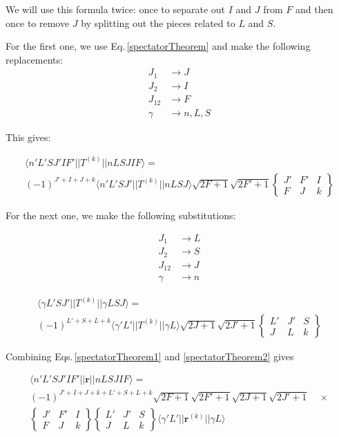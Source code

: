 We will use this formula twice: once to separate out $I$ and $J$ from $F$ and then once to remove $J$ by splitting out the pieces related to $L$ and $S$.

For the first one, we use Eq.\,\ref{spectatorTheorem} and make the following replacements:
\begin{align}
J_1&\rightarrow J\\
J_2&\rightarrow I\\
J_{12}&\rightarrow F\\
\gamma &\rightarrow  n,L,S
\end{align}

This gives: 

\begin{multline}\label{spectatorTheorem1}
\langle n' L' S J' I F'||T^{(k)}||n L S J I F\rangle=
\\(-1)^{J'+I+J+k}\langle n'L' S J'||T^{(k)}|| n L S J\rangle
\sqrt{2F+1}\sqrt{2F'+1}
\begin{Bmatrix}
J' & F' & I \\
F & J & k
\end{Bmatrix}
\end{multline}

For the next one, we make the following substitutions: 

\begin{align}
J_1&\rightarrow L\\
J_2&\rightarrow S\\
J_{12}&\rightarrow J\\
\gamma & \rightarrow n
\end{align}

\begin{multline}\label{spectatorTheorem2}
\langle\gamma L'SJ'||T^{(k)}||\gamma L S J\rangle=
\\(-1)^{L'+S+L+k}\langle\gamma'L'||T^{(k)}||\gamma L\rangle
\sqrt{2J+1}\sqrt{2J'+1}
\begin{Bmatrix}
L' & J' & S \\
J & L & k
\end{Bmatrix}
\end{multline}

Combining Eqs.\,\ref{spectatorTheorem1} and \ref{spectatorTheorem2} gives 

\begin{multline}
\langle n' L' S J' I F' ||\mathbf{r}||n L S J I F\rangle = \\
(-1)^{J'+I+J+k+L'+S+L+k}
\sqrt{2F+1}\sqrt{2F'+1}\sqrt{2J+1}\sqrt{2J'+1} \quad \times \\
\begin{Bmatrix}
J' & F' & I\\
F & J & k
\end{Bmatrix}
\begin{Bmatrix}
L' & J' & S\\
J & L & k
\end{Bmatrix}
\langle \gamma' L' ||\mathbf{r}^{(k)}|| \gamma L\rangle 
\end{multline}

